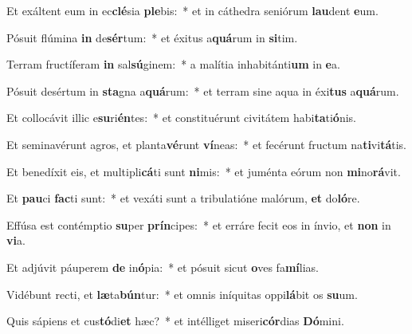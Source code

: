 \item Et exáltent eum in ec\textbf{clé}sia \textbf{ple}bis:~* et in cáthedra seniórum \textbf{lau}dent \textbf{e}um.
\item Pósuit flúmina \textbf{in} de\textbf{sér}tum:~* et éxitus a\textbf{quá}rum in \textbf{si}tim.
\item Terram fructíferam \textbf{in} sal\textbf{sú}ginem:~* a malítia inhabitánti\textbf{um} in \textbf{e}a.
\item Pósuit desértum in \textbf{sta}gna a\textbf{quá}rum:~* et terram sine aqua in éxi\textbf{tus} a\textbf{quá}rum.
\item Et collocávit illic e\textbf{su}ri\textbf{én}tes:~* et constituérunt civitátem habi\textbf{ta}ti\textbf{ó}nis.
\item Et seminavérunt agros, et planta\textbf{vé}runt \textbf{ví}neas:~* et fecérunt fructum na\textbf{ti}vi\textbf{tá}tis.
\item Et benedíxit eis, et multipli\textbf{cá}ti sunt \textbf{ni}mis:~* et juménta eórum non \textbf{mi}no\textbf{rá}vit.
\item Et \textbf{pau}ci \textbf{fac}ti sunt:~* et vexáti sunt a tribulatióne malórum, \textbf{et} do\textbf{ló}re.
\item Effúsa est contémptio \textbf{su}per \textbf{prín}cipes:~* et erráre fecit eos in ínvio, et \textbf{non} in \textbf{vi}a.
\item Et adjúvit páuperem \textbf{de} in\textbf{ó}pia:~* et pósuit sicut \textbf{o}ves fa\textbf{mí}lias.
\item Vidébunt recti, et \textbf{læ}ta\textbf{bún}tur:~* et omnis iníquitas oppi\textbf{lá}bit os \textbf{su}um.
\item Quis sápiens et cus\textbf{tó}di\textbf{et} hæc?~* et intélliget miseri\textbf{cór}dias \textbf{Dó}mini.
